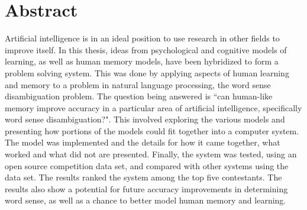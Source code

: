 \doublespacing 
\chapter*{Abstract}

Artificial intelligence is in an ideal position to use research in other fields
to improve itself.  In this thesis, ideas from psychological and cognitive
models of learning, as well as human memory models, have been hybridized to 
form a problem solving system.  
This was done by applying aspects of human learning and memory to a problem in
natural language processing, the word sense disambiguation problem. The question being 
answered is ``can human-like memory improve accuracy in a particular area of artificial
intelligence, specifically word sense disambiguation?". This involved exploring the 
various models and presenting how portions of the models could fit together into a 
computer system.  The model was
implemented and the details for how it came together, what worked and what did not are
presented.  Finally, the system was tested, using an open source competition data set, 
and compared with other systems using the data set.  The results ranked the system among
the top five contestants. The results also show a potential for future accuracy 
improvements in determining word sense, as well as a chance to better model human memory 
and learning.
